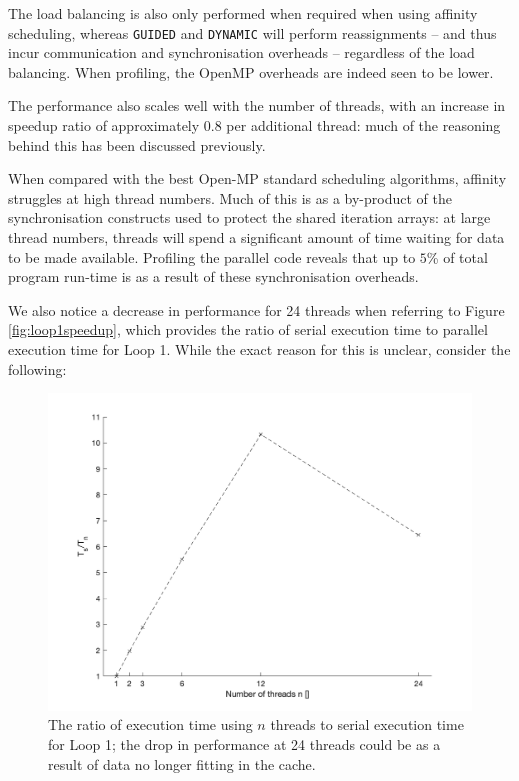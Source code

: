 \documentclass{article} %
\newcommand{\tp}{\texttt}
\begin{document}
The load balancing is also only performed when required when using affinity scheduling, whereas \tp{GUIDED} and \tp{DYNAMIC} will perform reassignments -- and thus incur communication and synchronisation overheads -- regardless of the load balancing.
When profiling, the OpenMP overheads are indeed seen to be lower.

The performance also scales well with the number of threads, with an increase in speedup ratio of approximately $0.8$ per additional thread: much of the reasoning behind this has been discussed previously.

When compared with the best Open-MP standard scheduling algorithms, affinity struggles at high thread numbers.
Much of this is as a by-product of the synchronisation constructs used to protect the shared iteration arrays: at large thread numbers, threads will spend a significant amount of time waiting for data to be made available.
Profiling the parallel code reveals that up to $5$\% of total program run-time is as a result of these synchronisation overheads.

We also notice a decrease in performance for 24 threads when referring to Figure \ref{fig:loop1speedup}, which provides the ratio of serial execution time to parallel execution time for Loop 1.
While the exact reason for this is unclear, consider the following:

\begin{figure}
    \centering
    \includegraphics[height=.35\textheight]{part2_plots/speedup_affinity_loop1.png}
    \caption{The ratio of execution time using $n$ threads to serial execution time for Loop 1; the drop in performance at 24 threads could be as a result of data no longer fitting in the cache.}
\end{figure}
\end{document}
